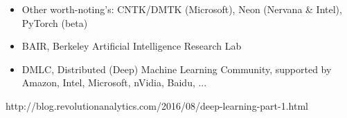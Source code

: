 \begin{frame}
{\scriptsize
\begin{itemize}\setlength\itemsep{0.5em}
\item[\raisebox{-0.4ex}{\alert{\HandRight}}] Other worth-noting's: CNTK/DMTK (Microsoft), Neon (Nervana \& Intel), PyTorch (\alert{beta})
\item BAIR, Berkeley Artificial Intelligence Research Lab 
\item DMLC, Distributed (Deep) Machine Learning Community, supported by Amazon, Intel, Microsoft, nVidia, Baidu, ...
\end{itemize}
}

\begin{center}
{\color{red}\scriptsize
http://blog.revolutionanalytics.com/2016/08/deep-learning-part-1.html
}
\end{center}

\end{frame}


